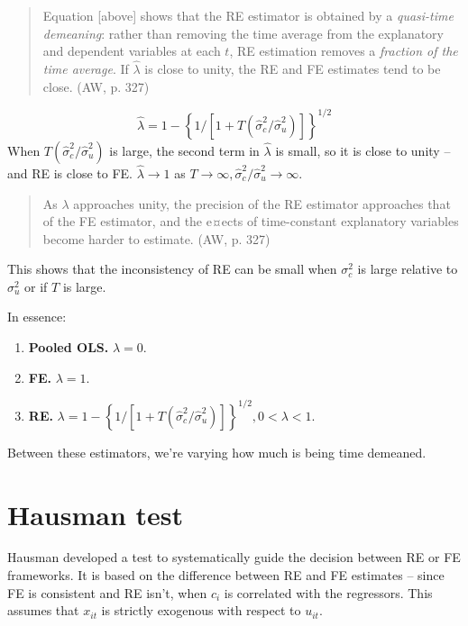 \documentclass[11pt, a4paper]{report}
\theoremstyle{plain}
\theoremstyle{plain}
\theoremstyle{remark}
\begin{document}
\begin{quote}
    Equation [above] shows that the RE estimator is obtained by a \textit{quasi-time demeaning}: rather than removing the time average from the explanatory and dependent
    variables at each $t$, RE estimation removes a \textit{fraction of the time average}. If $\hat{\lambda}$ is close
    to unity, the RE and FE estimates tend to be close. (AW, p. 327)
\end{quote}

\begin{equation}
    \hat{\lambda}=1-\left\{1 /\left[1+T\left(\hat{\sigma}_{c}^{2} / \hat{\sigma}_{u}^{2}\right)\right]\right\}^{1 / 2}
    \end{equation}
When $T\left(\hat{\sigma}_{c}^{2} / \hat{\sigma}_{u}^{2}\right)$ is large, the second term in $\hat{\lambda}$ is small, so it is close to unity -- and RE is close to FE. $\hat{\lambda} \to 1$ as $T \to \infty, \hat{\sigma}_{c}^{2} / \hat{\sigma}_{u}^{2} \rightarrow \infty$.

\begin{quote}
    As $\lambda$ approaches unity, the precision of the RE estimator
approaches that of the FE estimator, and the e¤ects of time-constant explanatory
variables become harder to estimate. (AW, p. 327)
\end{quote}

This shows that the inconsistency of RE can be small when $\sigma^2_c$ is large relative to $\sigma^2_u$ or if $T$ is large.

In essence: 
\begin{enumerate}
    \item \textbf{Pooled OLS.} $\lambda = 0$.
    \item \textbf{FE.} $\lambda = 1$.
    \item \textbf{RE.} $\lambda = 1-\left\{1 /\left[1+T\left(\hat{\sigma}_{c}^{2} / \hat{\sigma}_{u}^{2}\right)\right]\right\}^{1 / 2}, 0 < \lambda < 1.$
\end{enumerate}

Between these estimators, we're varying how much is being time demeaned.




\section{Hausman test}

Hausman developed a test to systematically guide the decision between RE or FE frameworks. It is based on the difference between RE and FE estimates -- since FE is consistent and RE isn't, when $c_i$ is correlated with the regressors. This assumes that $x_{it}$ is strictly exogenous with respect to $u_{it}$.
\end{document}
